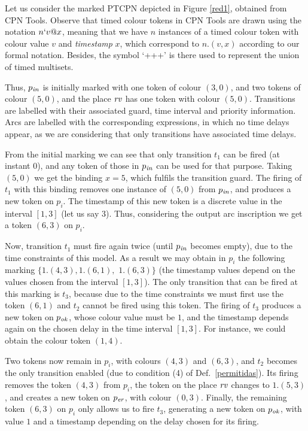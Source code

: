 \begin{example} Let us consider the marked PTCPN depicted in Figure \ref{red1}, 
obtained from CPN Tools. 
% 
Observe that timed colour tokens in CPN Tools are drawn
using the notation $n`v@x$,
meaning that we have $n$ instances of a timed colour token 
with colour value $v$ and {\em timestamp} $x$, which correspond to $n.(v,x)$
according to our formal notation. Besides, the symbol `+++'
is there used to represent the union of timed
multisets. 

Thus, $p_{\it in}$ is initially marked with one token
of colour $(3,0)$, and two tokens of colour $(5,0)$,
and the place ${\it rv}$ has one token with colour
$(5,0)$.  Transitions are labelled
with their associated guard, time interval and priority
information. 
Arcs are labelled with the corresponding expressions,
in which no time delays appear, as we are considering
that only transitions have associated time delays.

From the initial marking we can see that
only transition $t_1$ can be fired (at instant $0$), and
any token of those in $p_{\it in}$ can be used for
that purpose.  Taking $(5,0)$ we get the binding $x=5$,
which fulfils the transition guard.
The firing of $t_1$ with this binding removes
one instance of $(5,0)$ from $p_{\it in}$,
and produces a new token on $p_i$.
The timestamp of this new token is a discrete value
in the interval $[1,3]$ (let us say $3$).
Thus, considering the output
arc inscription we get a token $(6,3)$  on $p_i$.

Now, transition $t_1$ must fire again twice (until $p_{\it in}$ 
becomes empty), due to the time constraints of this model. 
As a result we may obtain in $p_i$ the following marking
$\{1.(4,3), 1.(6,1),$
$ 1.(6,3)\}$ (the timestamp values depend on the values
chosen from the interval $[1,3]$).
% 
The only transition that can be fired at this marking
is $t_3$, because due to the time constraints 
we must first use the token $(6,1)$
and $t_2$ cannot be fired using this token.
The firing of $t_3$ produces a new token on $p_{\it ok}$,
whose colour value must be $1$, and the timestamp
depends again on the chosen delay in the time interval
$[1,3]$. For instance, we could obtain the 
colour token $(1,4)$. 

Two tokens now remain in $p_i$, with colours  $(4,3)$ and 
$(6,3)$, and $t_2$ becomes the only transition
enabled (due to condition (4) of Def.\ \ref{permitidas}).
Its firing removes the token $(4,3)$ from $p_i$,
the token on the place ${\it rv}$ changes to $1.(5,3)$,  
and creates a new token on $p_{\it er}$, with colour $(0,3)$. 
%
% 
Finally, the remaining token $(6,3)$ on $p_i$ 
only allows us to fire $t_3$, generating a new token
on $p_{\it ok}$, with value $1$ and a timestamp
depending on the delay chosen for its firing.
\end{example}


